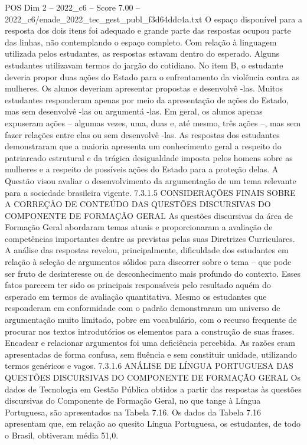 \begin{textsample}{POS Dim 2 – 2022\_c6 – Score 7.00 – 2022\_c6/enade\_2022\_tec\_gest\_publ\_f3d64ddc4a.txt}
O espaço disponível para a resposta dos dois itens foi adequado e grande parte das respostas ocupou parte das linhas, não contemplando o espaço completo.
Com relação à linguagem utilizada pelos estudantes, as respostas estavam dentro do esperado.
Alguns estudantes utilizavam termos do jargão do cotidiano.
No item B, o estudante deveria propor duas ações do Estado para o enfrentamento da violência contra as mulheres.
Os alunos deveriam apresentar propostas e desenvolvê -las.
Muitos estudantes responderam apenas por meio da apresentação de ações do Estado, mas sem desenvolvê -las ou argumentá -las.
Em geral, os alunos apenas expuseram ações – algumas vezes, uma, duas e, até mesmo, três ações –, mas sem fazer relações entre elas ou sem desenvolvê -las.
As respostas dos estudantes demonstraram que a maioria apresenta um conhecimento geral a respeito do patriarcado estrutural e da trágica desigualdade imposta pelos homens sobre as mulheres e a respeito de possíveis ações do Estado para a proteção delas.
A Questão visou avaliar o desenvolvimento da argumentação de um tema relevante para a sociedade brasileira vigente. 7.3.1.5 CONSIDERAÇÕES FINAIS SOBRE A CORREÇÃO DE CONTEÚDO DAS QUESTÕES DISCURSIVAS DO COMPONENTE DE FORMAÇÃO GERAL As questões discursivas da área de Formação Geral abordaram temas atuais e proporcionaram a avaliação de competências importantes dentre as previstas pelas suas Diretrizes Curriculares.
A análise das respostas revelou, principalmente, dificuldade dos estudantes em relação à seleção de argumentos sólidos para discorrer sobre o tema – que pode ser fruto de desinteresse ou de desconhecimento mais profundo do contexto.
Esses fatos parecem ter sido os principais responsáveis pelo resultado aquém do esperado em termos de avaliação quantitativa.
Mesmo os estudantes que responderam em conformidade com o padrão demonstraram um universo de argumentação muito limitado, pobre em vocabulário, com o recurso frequente de procurar nos textos introdutórios os elementos para a construção de suas frases.
Encadear e relacionar argumentos foi uma deficiência percebida.
As razões eram apresentadas de forma confusa, sem fluência e sem constituir unidade, utilizando termos genéricos e vagos. 7.3.1.6 ANÁLISE DE LÍNGUA PORTUGUESA DAS QUESTÕES DISCURSIVAS DO COMPONENTE DE FORMAÇÃO GERAL Os dados de Tecnologia em Gestão Pública obtidos a partir das respostas às questões discursivas do Componente de Formação Geral, no que tange à Língua Portuguesa, são apresentados na Tabela 7.16.
Os dados da Tabela 7.16 apresentam que, em relação ao quesito Língua Portuguesa, os estudantes, de todo o Brasil, obtiveram média 51,0.

\end{textsample}

